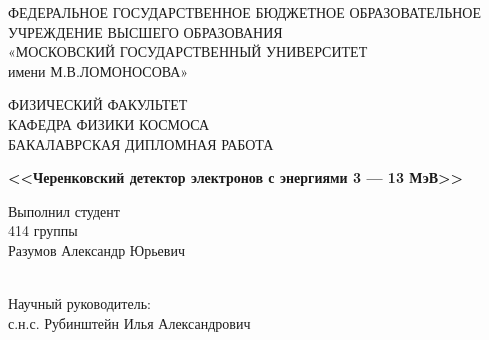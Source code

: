 \documentclass[12pt,a4paper]{report} %
\begin{document}
\setlength{\parindent}{1.25cm} %
\sloppy   %

\onehalfspacing   %
\renewcommand{\cftchapdotsep}{\cftdotsep} %

\renewcommand\bibname{СПИСОК ИСПОЛЬЗОВАННЫХ ИСТОЧНИКОВ}

\thispagestyle{empty}
\begin{titlepage}
\begin{center}
ФЕДЕРАЛЬНОЕ ГОСУДАРСТВЕННОЕ БЮДЖЕТНОЕ ОБРАЗОВАТЕЛЬНОЕ
УЧРЕЖДЕНИЕ ВЫСШЕГО ОБРАЗОВАНИЯ \\
«МОСКОВСКИЙ ГОСУДАРСТВЕННЫЙ УНИВЕРСИТЕТ\\
имени М.В.ЛОМОНОСОВА»
\vspace{1cm}

ФИЗИЧЕСКИЙ ФАКУЛЬТЕТ\\
\vspace{1cm}
КАФЕДРА ФИЗИКИ КОСМОСА\\

\vspace{1cm}
БАКАЛАВРСКАЯ ДИПЛОМНАЯ РАБОТА\\
\vspace{1cm}

\textbf{<<Черенковский детектор электронов с энергиями 3 --- 13 МэВ>>}


\end{center}


\begin{flushright}
\vspace{1cm}

Выполнил студент \\
414 группы\\

Разумов Александр Юрьевич\\

\underline{\hspace{3cm}}\\ %

\vspace{1cm}

Научный руководитель:\\
с.н.с. Рубинштейн Илья Александрович\\
\underline{\hspace{3cm}}\\
 

\end{flushright}
\end{titlepage}
\end{document}
